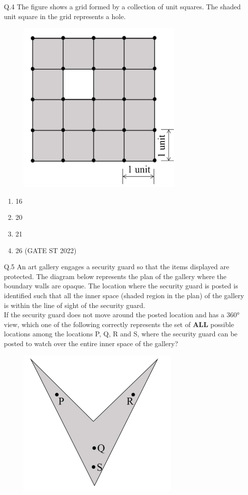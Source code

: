 \documentclass[journal,12pt,onecolumn]{IEEEtran}
\theoremstyle{remark}
\begin{document}
Q.4 The figure shows a grid formed by a collection of unit squares. The shaded unit square in the grid represents a hole.
	\begin{figure}[H]
		\centering
		\includegraphics[width=0.3\linewidth]{figs/screenshot001}
		\caption{}
		\label{fig:screenshot001}
	\end{figure}
	\begin{enumerate}[label=(\Alph*)]
		\item 16
		\item 20
		\item 21
		\item 26
		\hfill (GATE ST 2022)
	\end{enumerate}
	\vspace{2em}
Q.5 An art gallery engages a security guard so that the items displayed are protected. The diagram below represents the plan of the gallery where the boundary walls are opaque. The location where the security guard is posted is identified such that all the inner space (shaded region in the plan) of the gallery is within the line of sight of the security guard.\\
If the security guard does not move around the posted location and has a 360° view, which one of the following correctly represents the set of \textbf{ALL} possible locations among the locations P, Q, R and S, where the security guard can be posted to watch over the entire inner space of the gallery?\\
\begin{figure}[H]
		\centering
		\includegraphics[width=0.4\linewidth]{figs/screenshot002}
		\caption{}
		\label{fig:screenshot002}
\end{figure}
\end{document}
